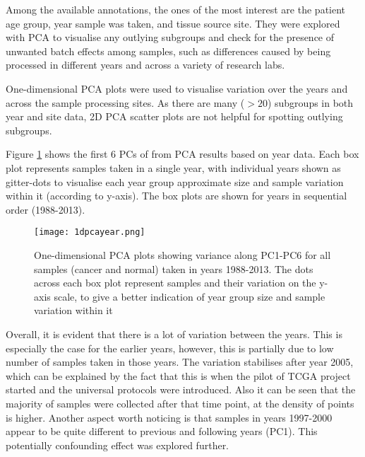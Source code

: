     Among the available annotations, the ones of the most interest are the patient age group, year sample was taken, and tissue source site. They were explored with PCA to visualise any outlying subgroups and check for the presence of unwanted batch effects among samples, such as differences caused by being processed in different years and across a variety of research labs.
    
    One-dimensional PCA plots were used to visualise variation over the years and across the sample processing sites. As there are many ($>20$) subgroups in both year and site data, 2D PCA scatter plots are not helpful for spotting outlying subgroups. 
    
    Figure \ref{fig:1dpcayear} shows the first 6 PCs of from PCA results based on year data. Each box plot represents samples taken in a single year, with individual years shown as gitter-dots to visualise each year group approximate size and sample variation within it (according to y-axis). The box plots are shown for years in sequential order (1988-2013). \\
  
        
            \begin{figure}[!h]
            \centering
            \texttt{[image: 1dpcayear.png]}
            \caption[1D PCA plot based on year data]{One-dimensional PCA plots showing variance along PC1-PC6 for all samples (cancer and normal) taken in years 1988-2013. The dots across each box plot represent samples and their variation on the y-axis scale, to give a better indication of year group size and sample variation within it}
            \label{fig:1dpcayear}
            \end{figure}
    
    Overall, it is evident that there is a lot of variation between the years. This is especially the case for the earlier years, however, this is partially due to low number of samples taken in those years.  The variation stabilises after year 2005, which can be explained by the fact that this is when the pilot of TCGA \cite{OverviewTCGA} project started and the universal protocols were introduced. Also it can be seen that the majority of samples were collected after that time point, at the density of points is higher. Another aspect worth noticing is that samples in years 1997-2000 appear to be quite different to previous and following years (PC1). This potentially confounding effect was explored further. \\
    \newline
    
